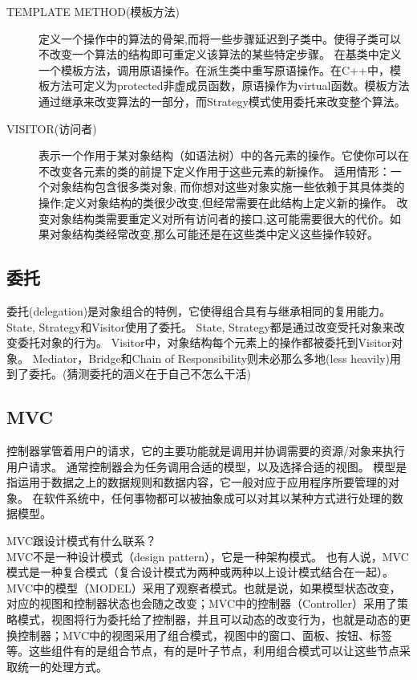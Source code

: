 \begin{description}
\item [TEMPLATE METHOD(模板方法)]
定义一个操作中的算法的骨架,而将一些步骤延迟到子类中。使得子类可以不改变一个算法的结构即可重定义该算法的某些特定步骤。
在基类中定义一个模板方法，调用原语操作。在派生类中重写原语操作。在C++中，模板方法可定义为protected非虚成员函数，原语操作为virtual函数。模板方法通过继承来改变算法的一部分，而Strategy模式使用委托来改变整个算法。
\item [VISITOR(访问者)]
表示一个作用于某对象结构（如语法树）中的各元素的操作。它使你可以在不改变各元素的类的前提下定义作用于这些元素的新操作。
适用情形：一个对象结构包含很多类对象, 而你想对这些对象实施一些依赖于其具体类的操作;定义对象结构的类很少改变,但经常需要在此结构上定义新的操作。
改变对象结构类需要重定义对所有访问者的接口,这可能需要很大的代价。如果对象结构类经常改变,那么可能还是在这些类中定义这些操作较好。



\end{description}


\subsection{委托}
委托(delegation)是对象组合的特例，它使得组合具有与继承相同的复用能力。
State, Strategy和Visitor使用了委托。
State, Strategy都是通过改变受托对象来改变委托对象的行为。
Visitor中，对象结构每个元素上的操作都被委托到Visitor对象。
Mediator，Bridge和Chain of Responsibility则未必那么多地(less heavily)用到了委托。(猜测委托的涵义在于自己不怎么干活)



\subsection{MVC}
控制器掌管着用户的请求，它的主要功能就是调用并协调需要的资源/对象来执行用户请求。
通常控制器会为任务调用合适的模型，以及选择合适的视图。
模型是指运用于数据之上的数据规则和数据内容，它一般对应于应用程序所要管理的对象。
在软件系统中，任何事物都可以被抽象成可以对其以某种方式进行处理的数据模型。

MVC跟设计模式有什么联系？\\
MVC不是一种设计模式（design pattern），它是一种架构模式。
也有人说，MVC模式是一种复合模式（复合设计模式为两种或两种以上设计模式结合在一起）。
MVC中的模型（MODEL）采用了观察者模式。也就是说，如果模型状态改变，对应的视图和控制器状态也会随之改变；MVC中的控制器（Controller）采用了策略模式，视图将行为委托给了控制器，并且可以动态的改变行为，也就是动态的更换控制器；MVC中的视图采用了组合模式，视图中的窗口、面板、按钮、标签等。这些组件有的是组合节点，有的是叶子节点，利用组合模式可以让这些节点采取统一的处理方式。

